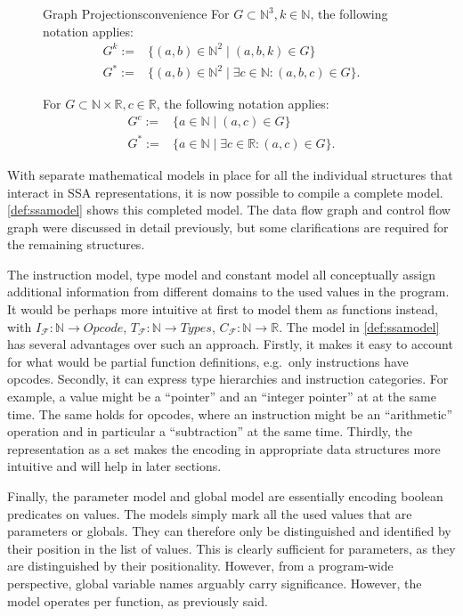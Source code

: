 \begin{figure}[p]
\begin{notation}{Graph Projections}{convenience}
    For $G\subset\mathbb N^3, k\in\mathbb N$, the following notation applies:
    \begin{align*}
        G^k:=&\{(a,b)\in\mathbb N^2\mid (a,b,k)\in G\}\\
        G^*:=&\{(a,b)\in\mathbb N^2\mid \exists c\in\mathbb N:(a,b,c)\in G\}.
    \end{align*}

    For $G\subset\mathbb N\times\mathbb R, c\in\mathbb R$, the following
    notation applies:
    \begin{align*}
        G^c:=&\{a\in\mathbb N\mid (a,c)\in G\}\\
        G^*:=&\{a\in\mathbb N\mid \exists c\in\mathbb R:(a,c)\in G\}.
    \end{align*}
\end{notation}
\end{figure}

    With separate mathematical models in place for all the individual structures
    that interact in SSA representations, it is now possible to compile a
    complete model.
    \autoref{def:ssamodel} shows this completed model.
    The data flow graph and control flow graph were discussed in detail
    previously, but some clarifications are required for the remaining
    structures.

    The instruction model, type model and constant model all conceptually assign
    additional information from different domains to the used values in the
    program.
    It would be perhaps more intuitive at first to model them as functions
    instead, with $I_\mathcal F\colon\mathbb N\rightarrow Opcode$,
    $T_\mathcal F\colon\mathbb N\rightarrow Types$,
    $C_\mathcal F\colon\mathbb N\rightarrow \mathbb R$.
    The model in \autoref{def:ssamodel} has several advantages over such an
    approach.
    Firstly, it makes it easy to account for what would be partial function
    definitions, e.g.\ only instructions have opcodes.
    Secondly, it can express type hierarchies and instruction categories.
    For example, a value might be a ``pointer'' and an ``integer pointer'' at
    at the same time.
    The same holds for opcodes, where an instruction might be an ``arithmetic''
    operation and in particular a ``subtraction'' at the same time.
    Thirdly, the representation as a set makes the encoding in appropriate data
    structures more intuitive and will help in later sections.

    Finally, the parameter model and global model are essentially encoding
    boolean predicates on values.
    The models simply mark all the used values that are parameters or globals.
    They can therefore only be distinguished and identified by their position
    in the list of values.
    This is clearly sufficient for parameters, as they are distinguished by
    their positionality.
    However, from a program-wide perspective, global variable names arguably
    carry significance.
    However, the model operates per function, as previously said.

